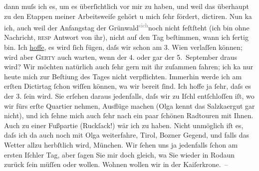               dann muſs ich es, um es überſichtlich vor mir zu haben, und weil das überhaupt zu den
               Etappen meiner Arbeitsweiſe gehört u mich{ }ſehr fördert, dictiren. Nun ka{\geminationn} ich, auch weil der Anfangstag der Grünwald\substVorne{}\textsuperscript{\textcolor{gray}{sich}}\substDazwischen{}noch nicht feſtſteht\substHinten{} (ich bin ohne Nachricht, \textsc{resp} Antwort von ihr),
               nicht {\pb}auf den Tag beſtimmen, wann ich fertig bin. Ich
                  \uline{hoffe}, es wird{ }ſich fügen, daſs wir schon am
                  3.{ }Wien verlaſſen können; wird aber \textsc{Gerty} auch warten, wenn der 4. oder gar der 5. September
               draus wird? Wir möchten natürlich auch{ }ſehr gern mit ihr zuſammen fahren; ich ka{\geminationn} nur heute mich zur Beſti{\geminationm}ung des Tages nicht verpflichten. Immerhin werde ich am erſten Dictirtag{ }ſchon
               wiſſen können, wa{\geminationn} wir bereit{ }ſind. Ich hoffe ja{ }ſehr,
               daſs es der 3.{ }ſein wird. Sie erſehen daraus {\pb}jedenfalls, daſs wir zu Iſchl entſchloſſen iſt, wo wir fürs erſte Quartier nehmen, Ausflüge machen
                  (Olga kennt das Salzka{\geminationm}ergut gar nicht), und ich{ }ſehne mich auch{ }ſehr nach ein paar{ }ſchönen Radtouren mit Ihnen. Auch zu einer
               Fußpartie (Ruckſack!) wär ich zu haben. Nicht unmöglich iſt es, daſs ich da{\geminationn} auch noch mit Olga weiterfahre, Tirol, Bozner Gegend, und falls das Wetter allzu
               herbſtlich wird, München. Wir{ }ſehen uns ja
               jedenfalls{ }ſchon am ersten {\pb}Iſchler Tag, aber{ }ſagen Sie mir doch gleich, wa{\geminationn}{ }Sie wieder in Rodaun zurück{ }ſein müſſen oder wollen. Wohnen wollen wir in der Kaiſerkrone. –\pend
           
